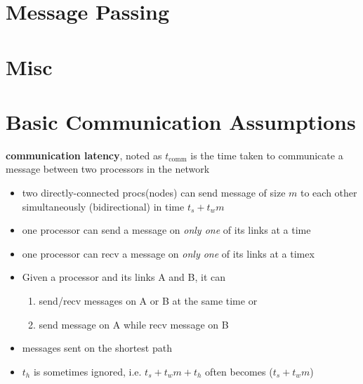 \section*{Message Passing}
% 
\section*{Misc}

\section*{Basic Communication Assumptions}
\textbf{communication latency}, noted as $t_{\text{comm}}$ is the time taken to communicate a message between two processors in the network
\label{comm}
\begin{itemize}
\item two directly-connected procs(nodes) can send message of size $m$ to each other simultaneously (bidirectional) in time $t_{s} + t_{w}m$
\item one processor can send a message on \emph{only one} of its links at a time
\item one processor can recv a message on \emph{only one} of its links at a timex
\item Given a processor and its links A and B, it can
  \begin{enumerate}
  \item send/recv messages on A or B at the same time or
  \item send message on A while recv message on B
  \end{enumerate}
\item messages sent on the shortest path
\item $t_h$ is sometimes ignored, i.e. $t_s + t_{w}m + t_h$ often becomes ($t_s + t_{w}m$)
\end{itemize}
